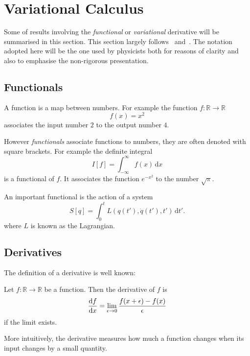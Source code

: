 \chapter{Variational Calculus}
\label{appendix:variational_calculus}

Some of results involving the \emph{functional} or \emph{variational} derivative will be summarised in this section.
This section largely follows~\cite{Lancaster2014} and~\cite{Goldenfeld1992}. The notation adopted here will be the one used by physicists
both for reasons of clarity and also to emphasise the non-rigorous presentation.

\section{Functionals}
A function is a map between numbers. For example the function $f\colon \mathbb{R} \rightarrow \mathbb{R}$
\begin{equation}
  \label{eq:example_function}
  f(x) = x^2
\end{equation}
associates the input number $2$ to the output number $4$.

However \emph{functionals} associate functions to numbers, they are often denoted with square brackets. For example
the definite integral
\begin{equation}
  \label{eq:example_functional_definite_integral}
  I[f] = \int_{-\infty}^{\infty} f(x) \, \mathrm{d}x
\end{equation}
is a functional of $f$. It associates the function $e^{-x^2}$ to the number $\sqrt{\pi}$.

An important functional is the action of a system
\begin{equation}
  \label{eq:example_functional_action}
  S[q] = \int_0^t L(q(t'),\dot{q}(t'),t')\,\mathrm{d}t'.
\end{equation}
where $L$ is known as the Lagrangian.


\section{Derivatives}
The definition of a derivative is well known:
\begin{definition}
  \label{definition:derivative}
  Let $f\colon \mathbb{R} \rightarrow \mathbb{R}$ be a function. Then the derivative of $f$ is
  \begin{equation}
    \label{eq:definition_of_derivative}
    \dv{f}{x} = \lim_{\epsilon\rightarrow 0} \frac{f(x + \epsilon) - f(x)}{\epsilon}
  \end{equation}
  if the limit exists.
\end{definition}
More intuitively, the derivative measures how much a function changes when its input changes by a small quantity.


